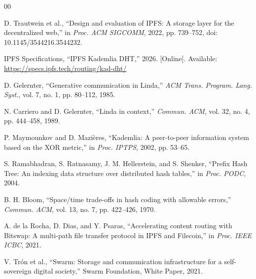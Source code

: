 \documentclass[conference]{IEEEtran}
\begin{document}
\begin{thebibliography}{00}

D. Trautwein et al., ``Design and evaluation of IPFS: A storage layer
for the decentralized web,'' in \emph{Proc. ACM SIGCOMM}, 2022,
pp. 739--752, doi: 10.1145/3544216.3544232.

IPFS Specifications, ``IPFS Kademlia DHT,'' 2026. [Online].
Available: \url{https://specs.ipfs.tech/routing/kad-dht/}

D. Gelernter, ``Generative communication in Linda,'' \emph{ACM Trans.
Program. Lang. Syst.}, vol. 7, no. 1, pp. 80--112, 1985.

N. Carriero and D. Gelernter, ``Linda in context,'' \emph{Commun. ACM},
vol. 32, no. 4, pp. 444--458, 1989.

P. Maymounkov and D. Mazi\`eres, ``Kademlia: A peer-to-peer information
system based on the XOR metric,'' in \emph{Proc. IPTPS}, 2002,
pp. 53--65.

S. Ramabhadran, S. Ratnasamy, J. M. Hellerstein, and S. Shenker,
``Prefix Hash Tree: An indexing data structure over distributed hash
tables,'' in \emph{Proc. PODC}, 2004.

B. H. Bloom, ``Space/time trade-offs in hash coding with allowable
errors,'' \emph{Commun. ACM}, vol. 13, no. 7, pp. 422--426, 1970.

A. de la Rocha, D. Dias, and Y. Psaras, ``Accelerating content routing
with Bitswap: A multi-path file transfer protocol in IPFS and
Filecoin,'' in \emph{Proc. IEEE ICBC}, 2021.

V. Tr\'on et al., ``Swarm: Storage and communication infrastructure
for a self-sovereign digital society,'' Swarm Foundation, White Paper,
2021.

\end{thebibliography}
\end{document}
